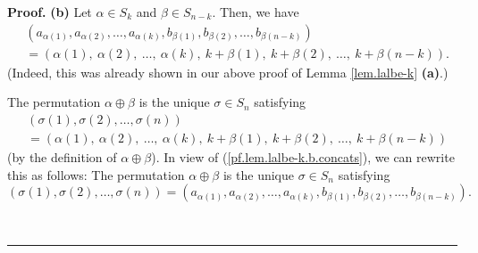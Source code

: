 \documentclass[numbers=enddot,12pt,final,onecolumn,notitlepage,english]{scrartcl}%
\theoremstyle{definition}
\newenvironment{proof}[1][Proof]{\noindent\textbf{#1.} }{\ \rule{0.5em}{0.5em}}
\newenvironment{verlong}{}{}
\begin{document}
\begin{verlong}
\begin{proof}
\textbf{(b)} Let $\alpha\in S_{k}$ and $\beta\in S_{n-k}$. Then, we have%
\begin{align}
&  \left(  a_{\alpha\left(  1\right)  },a_{\alpha\left(  2\right)  }%
,\ldots,a_{\alpha\left(  k\right)  },b_{\beta\left(  1\right)  }%
,b_{\beta\left(  2\right)  },\ldots,b_{\beta\left(  n-k\right)  }\right)
\nonumber\\
&  =\left(  \alpha\left(  1\right)  ,\ \alpha\left(  2\right)  ,\ \ldots
,\ \alpha\left(  k\right)  ,\ k+\beta\left(  1\right)  ,\ k+\beta\left(
2\right)  ,\ \ldots,\ k+\beta\left(  n-k\right)  \right)  .
\label{pf.lem.lalbe-k.b.concats}%
\end{align}
(Indeed, this was already shown in our above proof of Lemma \ref{lem.lalbe-k}
\textbf{(a)}.)

The permutation $\alpha\oplus\beta$ is the unique $\sigma\in S_{n}$ satisfying%
\begin{align*}
&  \left(  \sigma\left(  1\right)  ,\sigma\left(  2\right)  ,\ldots
,\sigma\left(  n\right)  \right) \\
&  =\left(  \alpha\left(  1\right)  ,\ \alpha\left(  2\right)  ,\ \ldots
,\ \alpha\left(  k\right)  ,\ k+\beta\left(  1\right)  ,\ k+\beta\left(
2\right)  ,\ \ldots,\ k+\beta\left(  n-k\right)  \right)
\end{align*}
(by the definition of $\alpha\oplus\beta$). In view of
(\ref{pf.lem.lalbe-k.b.concats}), we can rewrite this as follows: The
permutation $\alpha\oplus\beta$ is the unique $\sigma\in S_{n}$ satisfying%
\[
\left(  \sigma\left(  1\right)  ,\sigma\left(  2\right)  ,\ldots,\sigma\left(
n\right)  \right)  =\left(  a_{\alpha\left(  1\right)  },a_{\alpha\left(
2\right)  },\ldots,a_{\alpha\left(  k\right)  },b_{\beta\left(  1\right)
},b_{\beta\left(  2\right)  },\ldots,b_{\beta\left(  n-k\right)  }\right)  .
\]



\end{proof}
\end{verlong}
\end{document}
